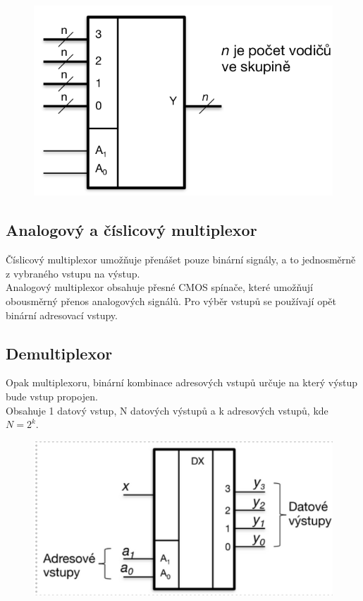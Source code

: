 \begin{figure}[h!]
    \centering
    \includegraphics[scale = 0.3]{img/SkupMux.png}
\end{figure}

\subsection{Analogový a číslicový multiplexor}
Číslicový multiplexor umožňuje přenášet pouze binární signály, a to jednosměrně z vybraného vstupu na výstup. \\
Analogový multiplexor obsahuje přesné CMOS spínače, které umožňují obousměrný přenos analogových signálů. Pro výběr vstupů se používají opět binární adresovací vstupy.\\

\subsection{Demultiplexor}
Opak multiplexoru, binární kombinace adresových vstupů určuje na který výstup bude vstup propojen. \\
Obsahuje 1 datový vstup, N datových výstupů a k adresových vstupů, kde \(N = 2^k\).\\

\begin{figure}[h!]
    \centering
    \includegraphics[scale = 0.3]{img/demux.png}
\end{figure}


